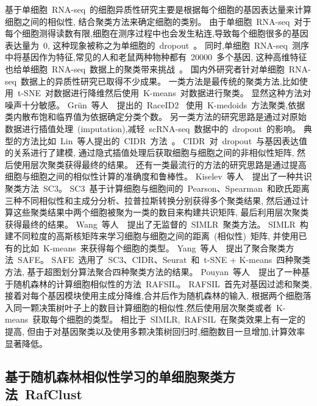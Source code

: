 基于单细胞~RNA-seq~的细胞异质性研究主要是根据每个细胞的基因表达量来计算细胞之间的相似性,
结合聚类方法来确定细胞的类别。
由于单细胞~RNA-seq~对于每个细胞测得读数有限,细胞在测序过程中也会发生粘连,导致每个细胞很多的基因表达量为~0,
这种现象被称之为单细胞的~dropout~\cite{vallejos2017normalizing}。
同时,单细胞~RNA-seq~测序中将基因作为特征,常见的人和老鼠两种物种都有~20000~多个基因,
这种高维特征也给单细胞~RNA-seq~数据上的聚类带来挑战~\cite{stegle2015computational}。
国内外研究者针对单细胞~RNA-seq~数据上的异质性研究已取得不少成果。
一类方法是最传统的聚类方法,比如使用~t-SNE~对数据进行降维然后使用~K-means~对数据进行聚类。
显然这种方法对噪声十分敏感。
Gr{\"u}n~等人~\cite{grun2016novo}~提出的~RaceID2~
使用~K-medoids~方法聚类,依据类内散布饱和临界值为依据确定分类个数。
另一类方法的研究思路是通过对原始数据进行插值处理~(imputation),减轻~scRNA-seq~数据中的~dropout~的影响。
典型的方法比如~Lin~等人提出的~CIDR~方法~\cite{lin2017cidr}。
CIDR~对~dropout~与基因表达值的关系进行了建模, 通过隐式插值处理后获取细胞与细胞之间的非相似性矩阵,
然后使用层次聚类获得最终的结果。
还有一类最流行的方法的研究思路是通过提高细胞与细胞之间的相似性计算的准确度和鲁棒性。
Kiselev~等人~\cite{kiselev2017sc3}~提出了一种共识聚类方法~SC3。
SC3~基于计算细胞与细胞间的~Pearson、Spearman~和欧氏距离三种不同相似性和主成分分析、拉普拉斯转换分别获得多个聚类结果,
然后通过计算这些聚类结果中两个细胞被聚为一类的数目来构建共识矩阵,
最后利用层次聚类获得最终的结果。
Wang~等人~\cite{wang2018simlr}~提出了无监督的~SIMLR~聚类方法。
SIMLR~构建不同粒度的高斯核矩阵来学习细胞与细胞之间的距离~(相似性)~矩阵,
并使用已有的比如~K-means~来获得每个细胞的类型。
Yang~等人~\cite{yang2018safe}~提出了聚合聚类方法~SAFE。
SAFE~选用了~SC3、CIDR、Seurat~和~t-SNE + K-means~四种聚类方法,
基于超图划分算法聚合四种聚类方法的结果。
Pouyan~等人~\cite{pouyan2018random}~提出了一种基于随机森林的计算细胞相似性的方法~RAFSIL。
RAFSIL~首先对基因过滤和聚类,接着对每个基因模块使用主成分降维,合并后作为随机森林的输入,
根据两个细胞落入同一颗决策树叶子上的数目计算细胞的相似性,然后使用层次聚类或者~K-means~获取每个细胞的类型。
相比于~SIMLR,~RAFSIL~在聚类效果上有一定的提高,
但由于对基因聚类以及使用多颗决策树回归时,细胞数目一旦增加,计算效率显著降低。

\subsection{基于随机森林相似性学习的单细胞聚类方法~RafClust}
\label{sec:method}

